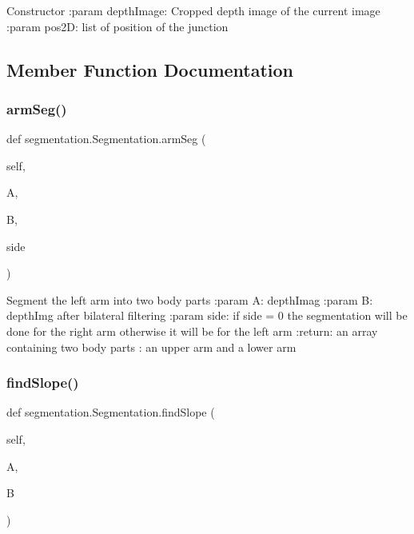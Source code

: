 \begin{DoxyVerb}Constructor
:param depthImage: Cropped depth image of the current image
:param pos2D: list of position of the junction
\end{DoxyVerb}
 

\subsection{Member Function Documentation}
\mbox{\label{classsegmentation_1_1_segmentation_acb6b057c22d3abbcc7de4e14453cfdc6}} 
\subsubsection{\texorpdfstring{arm\+Seg()}{armSeg()}}
{\footnotesize\ttfamily def segmentation.\+Segmentation.\+arm\+Seg (\begin{DoxyParamCaption}\item[{}]{self,  }\item[{}]{A,  }\item[{}]{B,  }\item[{}]{side }\end{DoxyParamCaption})}

\begin{DoxyVerb}Segment the left arm into two body parts
:param A: depthImag
:param B: depthImg after bilateral filtering
:param side: if side = 0 the segmentation will be done for the right arm
  otherwise it will be for the left arm
:return: an array containing two body parts : an upper arm and a lower arm
\end{DoxyVerb}
 \mbox{\label{classsegmentation_1_1_segmentation_a9ceb7a7b25953d9b693ab9f6fa1e6e3a}} 
\subsubsection{\texorpdfstring{find\+Slope()}{findSlope()}}
{\footnotesize\ttfamily def segmentation.\+Segmentation.\+find\+Slope (\begin{DoxyParamCaption}\item[{}]{self,  }\item[{}]{A,  }\item[{}]{B }\end{DoxyParamCaption})}

